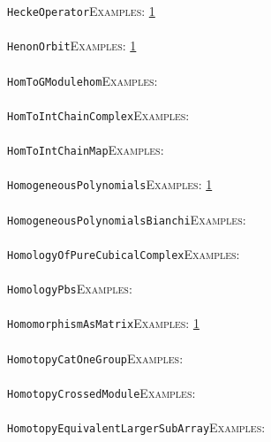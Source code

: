 \documentclass[a4paper,11pt]{report}
\begin{document}
{{ \texttt{HeckeOperator}{\nobreakspace}{\nobreakspace}{\nobreakspace}{\nobreakspace}\textsc{Examples:} \href{tutorial/chap10.html} {1}{\nobreakspace} \\
 \\
 \texttt{HenonOrbit}{\nobreakspace}{\nobreakspace}{\nobreakspace}{\nobreakspace}\textsc{Examples:} \href{tutorial/chap2.html} {1}{\nobreakspace} \\
 \\
 \texttt{HomToGModule{\textunderscore}hom}{\nobreakspace}{\nobreakspace}{\nobreakspace}{\nobreakspace}\textsc{Examples:} \\
 \\
 \texttt{HomToInt{\textunderscore}ChainComplex}{\nobreakspace}{\nobreakspace}{\nobreakspace}{\nobreakspace}\textsc{Examples:} \\
 \\
 \texttt{HomToInt{\textunderscore}ChainMap}{\nobreakspace}{\nobreakspace}{\nobreakspace}{\nobreakspace}\textsc{Examples:} \\
 \\
 \texttt{HomogeneousPolynomials}{\nobreakspace}{\nobreakspace}{\nobreakspace}{\nobreakspace}\textsc{Examples:} \href{tutorial/chap10.html} {1}{\nobreakspace} \\
 \\
 \texttt{HomogeneousPolynomials{\textunderscore}Bianchi}{\nobreakspace}{\nobreakspace}{\nobreakspace}{\nobreakspace}\textsc{Examples:} \\
 \\
 \texttt{HomologyOfPureCubicalComplex}{\nobreakspace}{\nobreakspace}{\nobreakspace}{\nobreakspace}\textsc{Examples:} \\
 \\
 \texttt{HomologyPbs}{\nobreakspace}{\nobreakspace}{\nobreakspace}{\nobreakspace}\textsc{Examples:} \\
 \\
 \texttt{HomomorphismAsMatrix}{\nobreakspace}{\nobreakspace}{\nobreakspace}{\nobreakspace}\textsc{Examples:} \href{tutorial/chap10.html} {1}{\nobreakspace} \\
 \\
 \texttt{HomotopyCatOneGroup}{\nobreakspace}{\nobreakspace}{\nobreakspace}{\nobreakspace}\textsc{Examples:} \\
 \\
 \texttt{HomotopyCrossedModule}{\nobreakspace}{\nobreakspace}{\nobreakspace}{\nobreakspace}\textsc{Examples:} \\
 \\
 \texttt{HomotopyEquivalentLargerSubArray}{\nobreakspace}{\nobreakspace}{\nobreakspace}{\nobreakspace}\textsc{Examples:} \\
}}
\end{document}
